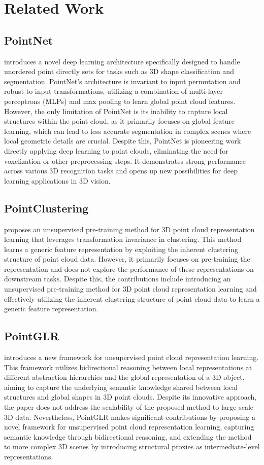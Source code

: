 \documentclass[../report.tex]{subfiles}
\begin{document}
    \section{Related Work}
    \label{sec:related_work}
     \subsection{PointNet}\cite{PointNet} introduces a novel deep learning architecture specifically designed to handle unordered point directly sets for tasks such as 3D shape classification and segmentation. PointNet's architecture is invariant to input permutation and robust to input transformations, utilizing a combination of multi-layer perceptrons (MLPs) and max pooling to learn global point cloud features. However, the only limitation of PointNet is its inability to capture local structures within the point cloud, as it primarily focuses on global feature learning, which can lead to less accurate segmentation in complex scenes where local geometric details are crucial. Despite this, PointNet is pioneering work directly applying deep learning to point clouds, eliminating the need for voxelization or other preprocessing steps. It demonstrates strong performance across various 3D recognition tasks and opens up new possibilities for deep learning applications in 3D vision.
    
    \subsection{PointClustering}\cite{PointClustering} proposes an unsupervised pre-training method for 3D point cloud representation learning that leverages transformation invariance in clustering. This method learns a generic feature representation by exploiting the inherent clustering structure of point cloud data. However, it primarily focuses on pre-training the representation and does not explore the performance of these representations on downstream tasks. Despite this, the contributions include introducing an unsupervised pre-training method for 3D point cloud representation learning and effectively utilizing the inherent clustering structure of point cloud data to learn a generic feature representation.
    
    \subsection{PointGLR}\cite{PointGLR} introduces a new framework for unsupervised point cloud representation learning. This framework utilizes bidirectional reasoning between local representations at different abstraction hierarchies and the global representation of a 3D object, aiming to capture the underlying semantic knowledge shared between local structures and global shapes in 3D point clouds. Despite its innovative approach, the paper does not address the scalability of the proposed method to large-scale 3D data. Nevertheless, PointGLR makes significant contributions by proposing a novel framework for unsupervised point cloud representation learning, capturing semantic knowledge through bidirectional reasoning, and extending the method to more complex 3D scenes by introducing structural proxies as intermediate-level representations.
\end{document}

